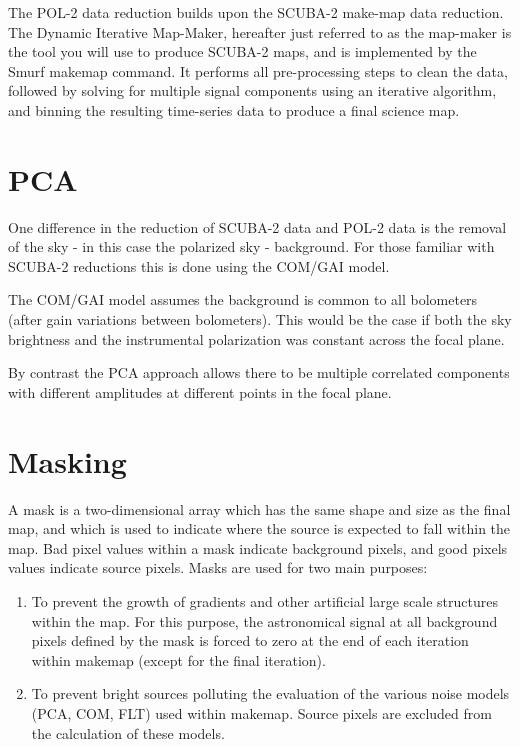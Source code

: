 The POL-2 data reduction builds upon the SCUBA-2 make-map data reduction. The Dynamic Iterative Map-Maker, hereafter just referred to as the map-maker is the tool you will use to produce SCUBA-2 maps, and is implemented by the Smurf makemap command. It performs all pre-processing steps to clean the data, followed by solving for multiple signal components using an iterative algorithm, and binning the resulting time-series data to produce a final science map. 




\section{PCA}

One difference in the reduction of SCUBA-2 data and POL-2 data is the removal of the sky - in this case the polarized sky - background. For those familiar with SCUBA-2 reductions this is done using the COM/GAI model. 

The COM/GAI model assumes the background is common to all bolometers (after gain variations between bolometers). This would be the case if both the sky brightness and the instrumental polarization was constant across the focal plane. 

By contrast the PCA approach allows there to be multiple correlated components with different amplitudes at different points in the focal plane.




\section{Masking}
A mask is a two-dimensional array which has the same shape and size as the final map, and
which is used to indicate where the source is expected to fall within the map. Bad pixel values
within a mask indicate background pixels, and good pixels values indicate source pixels. Masks
are used for two main purposes:

\begin{enumerate}\itemsep-0.2em
\item To prevent the growth of gradients and other artificial large scale structures within the
map.  For this purpose, the astronomical signal at all background pixels defined by the
mask is forced to zero at the end of each iteration within makemap (except for the final iteration).
\item To prevent bright sources polluting the evaluation of the various noise models (PCA, COM, FLT) used within
makemap. Source pixels are excluded from the calculation of these models.
\end{enumerate}


